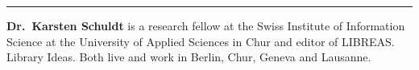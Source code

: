 \begin{center}\rule{0.5\linewidth}{\linethickness}\end{center}

\textbf{Dr.~Karsten Schuldt} is a research fellow at the Swiss Institute
of Information Science at the University of Applied Sciences in Chur and
editor of LIBREAS. Library Ideas. Both live and work in Berlin, Chur,
Geneva and Lausanne.
